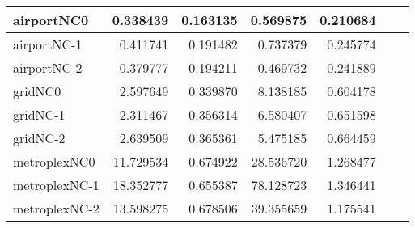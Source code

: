 \begin{longtable}{|l|r|r|r|r|r|r|}
airportNC0 & 0.338439 & 0.163135 & 0.569875 & 0.210684 \\ \hline
airportNC-1 & 0.411741 & 0.191482 & 0.737379 & 0.245774 \\ \hline
airportNC-2 & 0.379777 & 0.194211 & 0.469732 & 0.241889 \\ \hline
gridNC0 & 2.597649 & 0.339870 & 8.138185 & 0.604178 \\ \hline
gridNC-1 & 2.311467 & 0.356314 & 6.580407 & 0.651598 \\ \hline
gridNC-2 & 2.639509 & 0.365361 & 5.475185 & 0.664459 \\ \hline
metroplexNC0 & 11.729534 & 0.674922 & 28.536720 & 1.268477 \\ \hline
metroplexNC-1 & 18.352777 & 0.655387 & 78.128723 & 1.346441 \\ \hline
metroplexNC-2 & 13.598275 & 0.678506 & 39.355659 & 1.175541 \\ \hline
\end{longtable}
